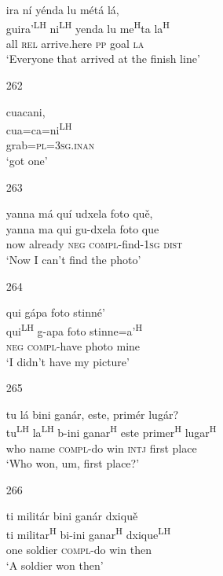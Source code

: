 \begin{itemize}
\glll   ira n\'{i} y\'{e}nda lu m\'{e}t\'{a} l\'{a},  \\
guira'\textsuperscript{LH} ni\textsuperscript{LH} yenda lu me\textsuperscript{H}ta la\textsuperscript{H} \\
all \textsc{rel} arrive.here \textsc{pp} goal \textsc{la} \\
\glt `Everyone that arrived at the finish line'
 


\item[262]
 
\glll   cuacani,  \\
cua=ca=ni\textsuperscript{LH} \\
grab=\textsc{pl}=\textsc{3sg.inan} \\
\glt `got one'
 


\item[263]
 
\glll   yanna m\'{a} qu\'{i} udxela foto qu\v{e}, \\
yanna ma qui gu-dxela foto que \\
now already \textsc{neg} \textsc{compl}-find-\textsc{1sg} \textsc{dist} \\
\glt `Now I can't find the photo'
 


\item[264]
 
\glll   qui g\'{a}pa foto stinn\'{e}' \\
qui\textsuperscript{LH} g-apa foto stinne=a'\textsuperscript{H} \\
\textsc{neg} \textsc{compl}-have photo mine \\
\glt `I didn't have my picture'
 



\item[265]

\glll tu l\'{a} bini gan\'{a}r, este, prim\'{e}r lug\'{a}r? \\
tu\textsuperscript{LH} la\textsuperscript{LH} b-ini ganar\textsuperscript{H} este primer\textsuperscript{H} lugar\textsuperscript{H} \\
who name \textsc{compl}-do win \textsc{intj} first place  \\
\glt `Who won, um, first place?'


\item[266]

\glll ti milit\'{a}r bini gan\'{a}r dxiqu\v{e} \\
ti militar\textsuperscript{H} bi-ini ganar\textsuperscript{H} dxique\textsuperscript{LH} \\
one soldier \textsc{compl}-do win then \\
\glt `A soldier won then' 





\end{itemize}
